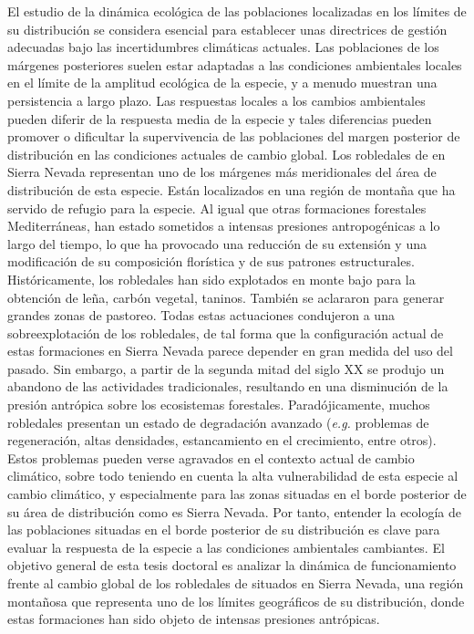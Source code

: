%
\label{sec:abstract}

El estudio de la dinámica ecológica de las poblaciones localizadas en los límites de su distribución se considera esencial para establecer unas directrices de gestión adecuadas bajo las incertidumbres climáticas actuales. Las poblaciones de los márgenes posteriores suelen estar adaptadas a las condiciones ambientales locales en el límite de la amplitud ecológica de la especie, y a menudo muestran una persistencia a largo plazo. Las respuestas locales a los cambios ambientales pueden diferir de la respuesta media de la especie y tales diferencias pueden promover o dificultar la supervivencia de las poblaciones del margen posterior de distribución en las condiciones actuales de cambio global. Los robledales de \Qp en Sierra Nevada representan uno de los márgenes más meridionales del  área de distribución de esta especie. Están localizados en una región de montaña que ha servido de refugio para la especie. Al igual que otras formaciones forestales Mediterráneas, han estado sometidos a intensas presiones antropogénicas a lo largo del tiempo, lo que ha provocado una reducción de su extensión y una modificación de su composición florística y de sus patrones estructurales. Históricamente, los robledales han sido explotados en monte bajo para la obtención de leña, carbón vegetal, taninos. También se aclararon para generar grandes zonas de pastoreo. Todas estas actuaciones condujeron a una sobreexplotación de los robledales, de tal forma que la configuración actual de estas formaciones en Sierra Nevada parece depender en gran medida del uso del pasado. Sin embargo, a partir de la segunda mitad del siglo XX se produjo un abandono de las actividades tradicionales, resultando en una disminución de la presión antrópica sobre los ecosistemas forestales. Paradójicamente, muchos robledales presentan un estado de degradación avanzado (\emph{e.g.} problemas de regeneración, altas densidades, estancamiento en el crecimiento, entre otros). Estos problemas pueden verse agravados en el contexto actual de cambio climático, sobre todo teniendo en cuenta la alta vulnerabilidad de esta especie al cambio climático, y especialmente para las zonas situadas en el borde posterior de su área de distribución como es Sierra Nevada. Por tanto, entender la ecología de las poblaciones situadas en el borde posterior de su distribución es clave para evaluar la respuesta de la especie a las condiciones ambientales cambiantes. El objetivo general de esta tesis doctoral es analizar la dinámica de funcionamiento frente al cambio global de los robledales de \Qp situados en Sierra Nevada, una región montañosa que representa uno de los límites geográficos de su distribución, donde estas formaciones han sido objeto de intensas presiones antrópicas. 

